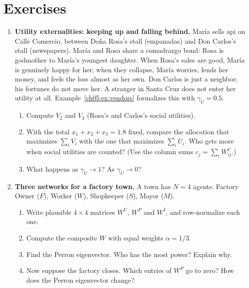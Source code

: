\documentclass[../structural_economics_book.tex]{subfiles}
\begin{document}
\section{Exercises}
\label{ch05:sec:exercises}

\begin{enumerate}[label=\textbf{5.\arabic*}, leftmargin=3em]

\item \textbf{Utility externalities: keeping up and falling behind.} Mar\'{i}a sells api on Calle Comercio, between Do\~{n}a Rosa's stall (empanadas) and Don Carlos's stall (newspapers). Mar\'{i}a and Rosa share a comadrazgo bond: Rosa is godmother to Mar\'{i}a's youngest daughter. When Rosa's sales are good, Mar\'{i}a is genuinely happy for her; when they collapse, Mar\'{i}a worries, lends her money, and feels the loss almost as her own. Don Carlos is just a neighbor; his fortunes do not move her. A stranger in Santa Cruz does not enter her utility at all. Example~\ref{ch05:ex:vendors} formalizes this with $\gamma_U = 0.5$.
\begin{enumerate}
\item Compute $V_2$ and $V_3$ (Rosa's and Carlos's social utilities).
\item With the total $x_1 + x_2 + x_3 = 1.8$ fixed, compare the allocation that maximizes $\sum_i V_i$ with the one that maximizes $\sum_i U_i$. Who gets more when social utilities are counted? (Use the column sums $c_j = \sum_i W^U_{ij}$.)
\item What happens as $\gamma_U \to 1$? As $\gamma_U \to 0$?
\end{enumerate}

\item \textbf{Three networks for a factory town.} A town has $N = 4$ agents: Factory Owner ($F$), Worker ($W$), Shopkeeper ($S$), Mayor ($M$).
\begin{enumerate}
\item Write plausible $4 \times 4$ matrices $W^U$, $W^P$ and $W^I$, and row-normalize each one.
\item Compute the composite $W$ with equal weights $\alpha = 1/3$.
\item Find the Perron eigenvector. Who has the most power? Explain why.
\item Now suppose the factory closes. Which entries of $W^P$ go to zero? How does the Perron eigenvector change?
\end{enumerate}


\end{enumerate}
\end{document}

